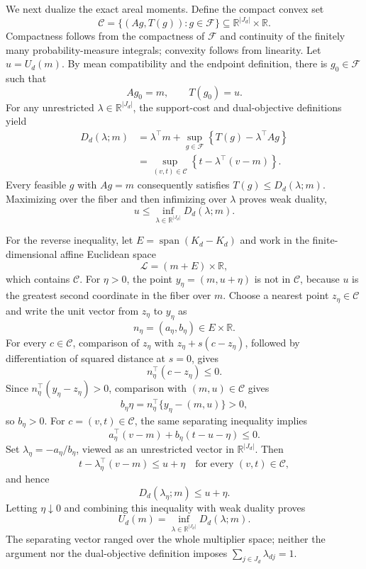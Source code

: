 We next dualize the exact areal moments.  Define the compact convex set
\[
 \mathcal C=\{(Ag,T(g)):g\in\mathcal F\}
 \subseteq \mathbb R^{\lvert J_d\rvert}\times\mathbb R.
\]
Compactness follows from the compactness of \(\mathcal F\) and continuity of the finitely many probability-measure integrals; convexity follows from linearity.  Let \(u=U_d(m)\).  By mean compatibility and the endpoint definition, there is \(g_0\in\mathcal F\) such that
\[
 Ag_0=m,
 \qquad
 T(g_0)=u.
\]
For any unrestricted \(\lambda\in\mathbb R^{\lvert J_d\rvert}\), the support-cost and dual-objective definitions yield
\[
\begin{aligned}
 D_d(\lambda;m)
 &=\lambda^\top m+\sup_{g\in\mathcal F}
       \left\{T(g)-\lambda^\top Ag\right\}\\
 &=\sup_{(v,t)\in\mathcal C}
       \left\{t-\lambda^\top(v-m)\right\}.
\end{aligned}
\]
Every feasible \(g\) with \(Ag=m\) consequently satisfies \(T(g)\leq D_d(\lambda;m)\).  Maximizing over the fiber and then infimizing over \(\lambda\) proves weak duality,
\[
 u\leq\inf_{\lambda\in\mathbb R^{\lvert J_d\rvert}}D_d(\lambda;m).
\]

For the reverse inequality, let \(E=\operatorname{span}(K_d-K_d)\) and work in the finite-dimensional affine Euclidean space
\[
 \mathcal L=(m+E)\times\mathbb R,
\]
which contains \(\mathcal C\).  For \(\eta>0\), the point \(y_\eta=(m,u+\eta)\) is not in \(\mathcal C\), because \(u\) is the greatest second coordinate in the fiber over \(m\).  Choose a nearest point \(z_\eta\in\mathcal C\) and write the unit vector from \(z_\eta\) to \(y_\eta\) as
\[
 n_\eta=(a_\eta,b_\eta)\in E\times\mathbb R.
\]
For every \(c\in\mathcal C\), comparison of \(z_\eta\) with \(z_\eta+s(c-z_\eta)\), followed by differentiation of squared distance at \(s=0\), gives
\[
 n_\eta^\top(c-z_\eta)\leq0.
\]
Since \(n_\eta^\top(y_\eta-z_\eta)>0\), comparison with \((m,u)\in\mathcal C\) gives
\[
 b_\eta\eta=n_\eta^\top\{y_\eta-(m,u)\}>0,
\]
so \(b_\eta>0\).  For \(c=(v,t)\in\mathcal C\), the same separating inequality implies
\[
 a_\eta^\top(v-m)+b_\eta(t-u-\eta)\leq0.
\]
Set \(\lambda_\eta=-a_\eta/b_\eta\), viewed as an unrestricted vector in \(\mathbb R^{\lvert J_d\rvert}\).  Then
\[
 t-\lambda_\eta^\top(v-m)\leq u+\eta
 \quad\text{for every }(v,t)\in\mathcal C,
\]
and hence
\[
 D_d(\lambda_\eta;m)\leq u+\eta.
\]
Letting \(\eta\downarrow0\) and combining this inequality with weak duality proves
\[
 U_d(m)=\inf_{\lambda\in\mathbb R^{\lvert J_d\rvert}}D_d(\lambda;m).
\]
The separating vector ranged over the whole multiplier space; neither the argument nor the dual-objective definition imposes \(\sum_{j\in J_d}\lambda_{dj}=1\).

